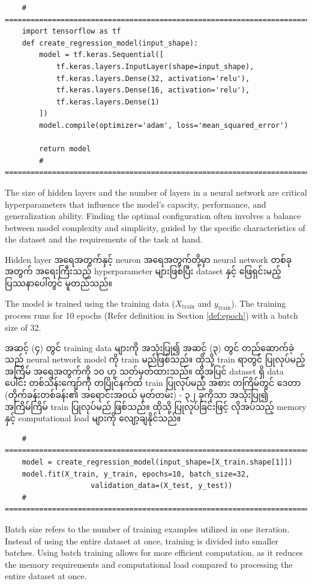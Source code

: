 \begin{lstlisting}
    # =========================================================================#
    import tensorflow as tf
    def create_regression_model(input_shape):
        model = tf.keras.Sequential([
            tf.keras.layers.InputLayer(shape=input_shape),        
            tf.keras.layers.Dense(32, activation='relu'),
            tf.keras.layers.Dense(16, activation='relu'),
            tf.keras.layers.Dense(1)
        ])    
        model.compile(optimizer='adam', loss='mean_squared_error')
    
        return model
        # =========================================================================#
\end{lstlisting}   
\begin{remark}
The size of hidden layers and the number of layers in a neural network are critical hyperparameters that influence the model's capacity, performance, and generalization ability. Finding the optimal configuration often involves a balance between model complexity and simplicity, guided by the specific characteristics of the dataset and the requirements of the task at hand. 

Hidden layer အရေအတွက်နှင့် neuron အရေအတွက်တို့မှာ neural network  တစ်ခုအတွက် အရေးကြီးသည့် hyperparameter များဖြစ်ပြီး dataset နှင့် ဖြေရှင်းမည့် ပြဿနာပေါ်တွင် မူတည်သည်။ 
\end{remark}

\begin{step}
The model is trained using the training data  (\(X_{\text{train}}\) and \(y_{\text{train}}\)). The training process runs for 10 epochs (Refer definition in Section \ref{def:epoch}) with a batch size of 32. 

အဆင့် (၄) တွင် training data များကို အသုံးပြု၍ အဆင့် (၃) တွင် တည်ဆောက်ခဲ့သည် neural network model ကို  train မည်ဖြစ်သည်။ ထိုသို့ train ရာတွင် ပြုလုပ်မည့် အကြိမ် အရေအတွက်ကို ၁၀ ဟု သတ်မှတ်ထားသည်။ ထို့အပြင် dataset ရှိ  data ပေါင်း တစ်သိန်းကျော်ကို တပြိုင်နက်ထဲ train ပြုလုပ်မည့် အစား တကြိမ်တွင် ဒေတာ (တိုက်ခန်းတစ်ခန်း၏ အရောင်းအ၀ယ် မှတ်တမ်း) - ၃၂ ခုကိုသာ အသုံးပြု၍  အကြိမ်ကြိမ် train ပြုလုပ်မည် ဖြစ်သည်။ ထိုသို့ ပြုလုပ်ခြင်းဖြင့် လိုအပ်သည့် memory နှင့် computational load  များကို လျော့ချနိုင်သည်။ 
    
\begin{lstlisting}
    # =========================================================================#
    model = create_regression_model(input_shape=[X_train.shape[1]])
    model.fit(X_train, y_train, epochs=10, batch_size=32, 
                    validation_data=(X_test, y_test))
    # =========================================================================#
\end{lstlisting}
\end{step}
\begin{remark}
Batch size refers to the number of training examples utilized in one iteration. Instead of using the entire dataset at once, training is divided into smaller batches. Using batch training allows for more efficient computation, as it reduces the memory requirements and computational load compared to processing the entire dataset at once.
\end{remark}

